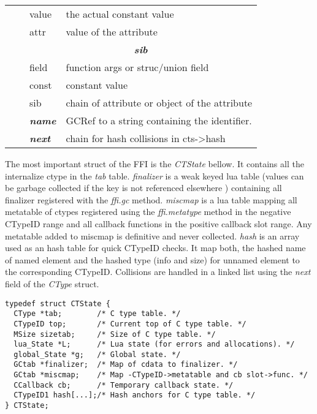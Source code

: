 \begin{table}[H]
\begin{tabular}{ll|l|l|}
                             &                & value                  & the actual constant value                          \\
                             &                & attr                   & value of the attribute                             \\ \cline{3-4}
                             &                & \multicolumn{2}{c|}{\textit{\textbf{sib}}}                                  \\ \cline{3-4}
                             &                & field                  & function args or struc/union field                 \\
                             &                & const                  & constant value                                     \\
                             &                & sib                    & chain of attribute or object of the attribute      \\ \cline{3-4}
                             &                & \textit{\textbf{name}} & GCRef to a string containing the identifier.       \\ \cline{3-4}
                             &                & \textit{\textbf{next}} & chain for hash collisions in cts-\textgreater hash \\ \cline{3-4}
\end{tabular}
\end{table}

The most important struct of the FFI is the \emph{CTState} bellow. It contains
all the internalize ctype in the \emph{tab} table. \emph{finalizer} is a weak
keyed lua table (values can be garbage collected if the key is not referenced
elsewhere ) containing all finalizer registered with the \emph{ffi.gc} method.
\emph{miscmap} is a lua table mapping all metatable of ctypes registered using
the \emph{ffi.metatype} method in the negative CTypeID range and all callback
functions in the positive callback slot range. Any metatable added to miscmap is
definitive and never collected. \emph{hash} is an array used as an hash table
for quick CTypeID checks. It map both, the hashed name of named element and the
hashed type (info and size) for unnamed element to the corresponding CTypeID.
Collisions are handled in a linked list using the \emph{next} field of the
\emph{CType} struct.

\begin{lstlisting}[style=CStyle]
typedef struct CTState {
  CType *tab;        /* C type table. */
  CTypeID top;       /* Current top of C type table. */
  MSize sizetab;     /* Size of C type table. */
  lua_State *L;      /* Lua state (for errors and allocations). */
  global_State *g;   /* Global state. */
  GCtab *finalizer;  /* Map of cdata to finalizer. */
  GCtab *miscmap;    /* Map -CTypeID->metatable and cb slot->func. */
  CCallback cb;      /* Temporary callback state. */
  CTypeID1 hash[...];/* Hash anchors for C type table. */
} CTState;
\end{lstlisting}